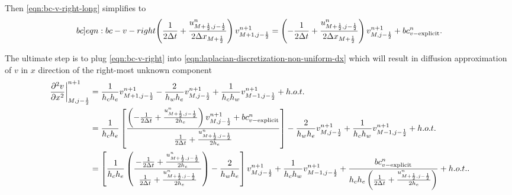 \documentclass{article}
\numberwithin{equation}{section}
\begin{document}
Then \cref{eqn:bc-v-right-long} simplifies to
\begin{equation}\label[bc]{eqn:bc-v-right}
\begin{gathered}
\left( \frac{1}{2\Delta t} + \frac{u^n_{M+\frac{1}{2},j-\frac{1}{2}}}{2\Delta x_{M+\frac{1}{2}}}\right) v^{n+1}_{M+1,j-\frac{1}{2}}
=\left( -\frac{1}{2\Delta t}+\frac{u^n_{M+\frac{1}{2},j-\frac{1}{2}}}{2\Delta x_{M+\frac{1}{2}}} \right)v^{n+1}_{M,j-\frac{1}{2}}+bc_{v-\text{explicit}}^n.
\end{gathered}
\end{equation}

The ultimate step is to plug \cref{eqn:bc-v-right} into \cref{eqn:laplacian-discretization-non-uniform-dx} which will result in diffusion approximation of $v$ in $x$ direction of the right-most unknown component
\begin{equation}\label{{eqn:lvxx-right}}
\begin{aligned}
	\left.\frac{\partial ^2 v}{\partial x^2}\right|_{M,j-\frac{1}{2}}^{n+1}
	&=\frac{1}{h_c h_e}v^{n+1}_{M+1,j-\frac{1}{2}} - \frac{2}{h_w h_e}v^{n+1}_{M,j-\frac{1}{2}} + \frac{1}{h_c h_w}v^{n+1}_{M-1,j-\frac{1}{2}}+h.o.t.\\
	&=\frac{1}{h_c h_e}\left[\frac{\left( -\frac{1}{2\Delta t}+\frac{u^n_{M+\frac{1}{2},j-\frac{1}{2}}}{2h_e} \right)v^{n+1}_{M,j-\frac{1}{2}}+bc_{v-\text{explicit}}^n}{\left. \frac{1}{2\Delta t} + \frac{u^n_{M+\frac{1}{2},j-\frac{1}{2}}}{2h_e}\right.}\right]- \frac{2}{h_w h_e}v^{n+1}_{M,j-\frac{1}{2}} + \frac{1}{h_c h_w}v^{n+1}_{M-1,j-\frac{1}{2}}+h.o.t.\\
	&=\left[ \frac{1}{h_c h_e}\left(\frac{\left. -\frac{1}{2\Delta t}+\frac{u^n_{M+\frac{1}{2},j-\frac{1}{2}}}{2h_e} \right.}{\left. \frac{1}{2\Delta t} + \frac{u^n_{M+\frac{1}{2},j-\frac{1}{2}}}{2h_e}\right.} \right) -\frac{2}{h_w h_e}\right]v^{n+1}_{M,j-\frac{1}{2}} + \frac{1}{h_c h_w}v^{n+1}_{M-1,j-\frac{1}{2}} + \frac{bc_{v-\text{explicit}}^n}{h_c h_e\left( \frac{1}{2\Delta t} + \frac{u^n_{M+\frac{1}{2},j-\frac{1}{2}}}{2h_e}\right)}+h.o.t..
\end{aligned}
\end{equation}
\end{document}
